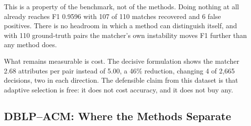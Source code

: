\documentclass[11pt]{article}
\begin{document}
This is a property of the benchmark, not of the methods. Doing nothing at all already
reaches F1 0.9596 with 107 of 110 matches recovered and 6 false positives. There is no
headroom in which a method can distinguish itself, and with 110 ground-truth pairs the
matcher's own instability moves F1 further than any method does.

What remains measurable is cost. The decisive formulation shows the matcher 2.68 attributes
per pair instead of 5.00, a 46\% reduction, changing 4 of 2{,}665 decisions, two in each
direction. The defensible claim from this dataset is that adaptive selection is free: it does
not cost accuracy, and it does not buy any.

\subsection{DBLP--ACM: Where the Methods Separate}
\label{sec:results-dblp}

\begin{table}[h]
\centering
{}
\caption{DBLP--ACM. 13{,}080 candidate pairs, 2{,}224 ground-truth matches. Metrics are
end-to-end and every configuration is scored over the same candidate set
(Section~\ref{sec:reblock}). Rows are ordered by F1.}
\end{table}
\end{document}
